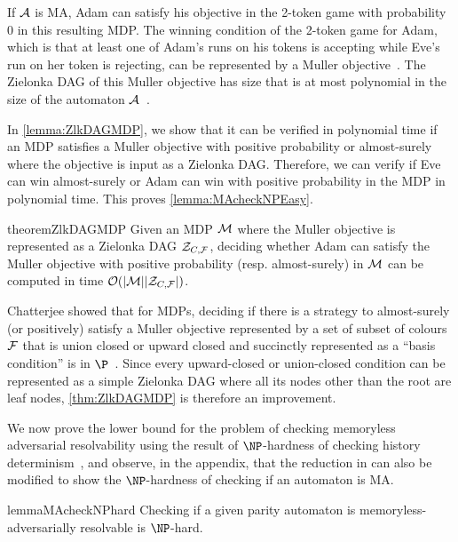     If $\mathcal{A}$ is MA, Adam can satisfy his objective in the 2-token game with probability $0$ in this resulting MDP. The winning condition of the 2-token game for Adam, which is that at least one of Adam's runs on his tokens is accepting while Eve's run on her token is rejecting, can be represented by a Muller objective~\cite[Page 70]{Pra25}. The Zielonka DAG of this Muller objective has size that is at most polynomial in the size of the automaton $\mathcal{A}$~\cite[Page 72]{Pra25}.

    In \cref{lemma:ZlkDAGMDP}, we show that it can be verified in polynomial time if an MDP  satisfies a Muller objective with positive probability or almost-surely where the objective is input as a Zielonka DAG. Therefore,
    we can verify if Eve can win almost-surely or Adam can win with positive probability in the MDP in polynomial time. This proves \cref{lemma:MAcheckNPEasy}. 

\begin{restatable}{theorem}{ZlkDAGMDP}\label{lemma:ZlkDAGMDP}\label{thm:ZlkDAGMDP}
        Given an MDP $\mathcal{M}$ where the Muller objective is represented as a Zielonka DAG $\mathcal{Z}_{C,\mathcal{F}}$, deciding whether Adam can satisfy the Muller objective with positive probability (resp. almost-surely) in $\mathcal{M}$ can be computed in time $\mathcal{O}(|\mathcal{M}||\mathcal{Z}_{C,\mathcal{F}}|)$.        
\end{restatable}

Chatterjee showed that for MDPs, deciding if there is a strategy to almost-surely (or positively) satisfy a Muller objective represented by a set of subset of colours $\mathcal{F}$ that is union closed or upward closed and succinctly represented as a ``basis condition'' is in $\P$~\cite[Section 4]{Cha07}. Since every upward-closed or union-closed condition can be represented as a simple Zielonka DAG where all its nodes other than the root are leaf nodes, \cref{thm:ZlkDAGMDP} is therefore an improvement. 

We now prove the lower bound for the problem of checking memoryless adversarial resolvability using the result of $\NP$-hardness of checking history determinism~\cite{Pra24a}, and observe, in the appendix, that the reduction in \cite{Pra24a} can also be modified to show the $\NP$-hardness of checking if an automaton is MA. 
\begin{restatable}{lemma}{MAcheckNPhard}\label{lemma:MAcheckNPhard}
    Checking if a given parity automaton is memoryless-adversarially resolvable is $\NP$-hard.
\end{restatable}

